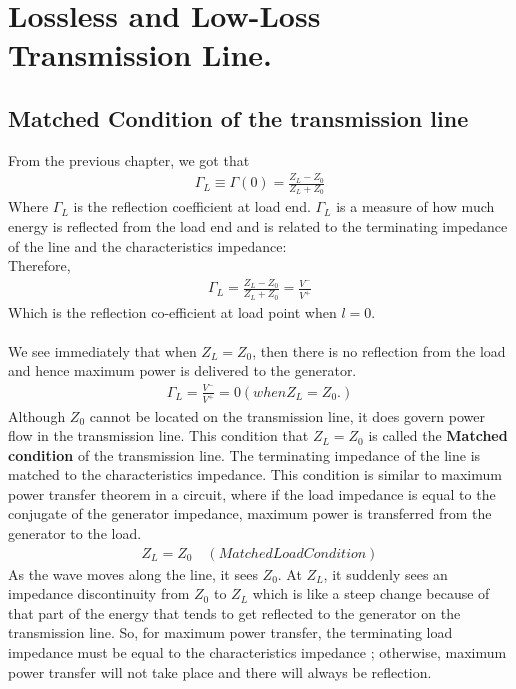 \chapter{Lossless and Low-Loss Transmission Line.}
\section{Matched Condition of the transmission line}
From the previous chapter, we got that
\begin{align*}
\Gamma_L \equiv \Gamma{(0)} = \frac{Z_L - Z_0}{Z_L + Z_0}
\end{align*}
Where $\Gamma_L$ is the reflection coefficient at load end. $\Gamma_L$ is a measure of how much energy is reflected from the load end and is related to the terminating impedance of the line and the characteristics impedance:\\

Therefore, 
\begin{align*}
\Gamma_L = \frac{Z_L - Z_0}{Z_L + Z_0} =  \frac{V^-}{V^+}
\end{align*}
Which is the reflection co-efficient at load point when $l = 0$.\\\\
We see immediately that when  $Z_L = Z_0$, then there is no reflection from the load and hence maximum power is delivered  to the generator.
\begin{align*}
\Gamma_L = \frac{V^-}{V^+} = 0
(when Z_L = Z_0.) 
\end{align*}
Although $Z_0$ cannot be located on the transmission line, it does govern power flow in the transmission line. This condition that $Z_L = Z_0$ is called the \textbf{Matched condition} of the transmission line. The terminating impedance of the line is matched to the characteristics impedance. This condition is similar to maximum power transfer theorem in a circuit, where if the load impedance is equal to the conjugate of the generator impedance, maximum power is transferred from the generator to the load. 
\begin{align*}
Z_L = Z_0 \quad (Matched Load Condition)
\end{align*}
As the wave moves along the line, it sees $Z_0$. At $Z_L$, it suddenly sees an impedance discontinuity from $Z_0$ to $Z_L$ which is like a steep change because of that part of the energy that tends to get reflected to the generator on the transmission line. So, for maximum power transfer, the terminating load impedance must be equal to the characteristics impedance ; otherwise, maximum power transfer will not take place and there will always be reflection.\\

